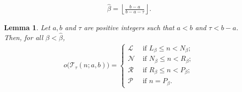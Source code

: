 \documentclass[10pt,a4paper]{amsart}
\newtheorem{lemma}{Lemma}
\newcommand{\hbeta}{\widehat\beta}
\newcommand{\lp}{\mathscr{L}}
\newcommand{\np}{\mathscr{N}}
\newcommand{\pp}{\mathscr{P}}
\newcommand{\rp}{\mathscr{R}}
\newcommand{\ts}{\mathcal{T}}
\begin{document}
 \begin{align}
    \hbeta=\left \lfloor \frac{b-a}{b-a-\tau}\right\rfloor.\label{eq:betahat}
\end{align} 

\begin{lemma}\label{lem: outcome ts below alpha block}
    Let $a,b$ and $\tau$ are positive integers such that $a<b$ and $\tau<b-a$. Then, for all $\beta<\hbeta$, %
    \begin{align*}
        o\big(\ts_\tau(n;a,b)\big)=\begin{cases}
            \lp & \text{ if } L_\beta \le  n<N_\beta ;\\
            \np & \text{ if } N_\beta\le  n< R_\beta;\\
            \rp & \text{ if } R_\beta\le  n< P_\beta;\\
            \pp & \text{ if } n=P_\beta.
        \end{cases}
    \end{align*}
\end{lemma}
\end{document}

